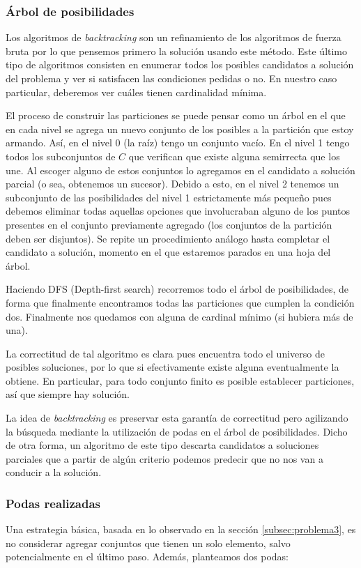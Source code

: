 \subsubsection{Árbol de posibilidades}
Los algoritmos de \textit{backtracking} son un refinamiento de los algoritmos de fuerza bruta por lo que pensemos primero la solución usando este método. Este último tipo de algoritmos consisten en enumerar todos los posibles candidatos a solución del problema y ver si satisfacen las condiciones pedidas o no. En nuestro caso particular, deberemos ver cuáles tienen cardinalidad mínima.

El proceso de construir las particiones se puede pensar como un árbol en el que en cada nivel se agrega un nuevo conjunto de los posibles a la partición que estoy armando. Así, en el nivel 0 (la raíz) tengo un conjunto vacío. En el nivel 1 tengo todos los subconjuntos de $C$ que verifican que existe alguna semirrecta que los une. Al escoger alguno de estos conjuntos lo agregamos en el candidato a solución parcial (o sea, obtenemos un sucesor). Debido a esto, en el nivel 2 tenemos un subconjunto de las posibilidades del nivel 1 estrictamente más pequeño pues debemos eliminar todas aquellas opciones que involucraban alguno de los puntos presentes en el conjunto previamente agregado (los conjuntos de la partición deben ser disjuntos). Se repite un procedimiento análogo hasta completar el candidato a solución, momento en el que estaremos parados en una hoja del árbol. 

Haciendo DFS (Depth-first search) recorremos todo el árbol de posibilidades, de forma que finalmente encontramos todas las particiones que cumplen la condición dos. Finalmente nos quedamos con alguna de cardinal mínimo (si hubiera más de una).

La correctitud de tal algoritmo es clara pues encuentra todo el universo de posibles soluciones, por lo que si efectivamente existe alguna eventualmente la obtiene. En particular, para todo conjunto finito es posible establecer particiones, así que siempre hay solución. 

La idea de \textit{backtracking} es preservar esta garantía de correctitud pero agilizando la búsqueda mediante la utilización de podas en el árbol de posibilidades. Dicho de otra forma, un algoritmo de este tipo descarta candidatos a soluciones parciales que a partir de algún criterio podemos predecir que no nos van a conducir a la solución. 

\subsubsection{Podas realizadas}
Una estrategia básica, basada en lo observado en la sección \ref{subsec:problema3}, es no considerar agregar conjuntos que tienen un solo elemento, salvo potencialmente en el último paso. Además, planteamos dos podas:

